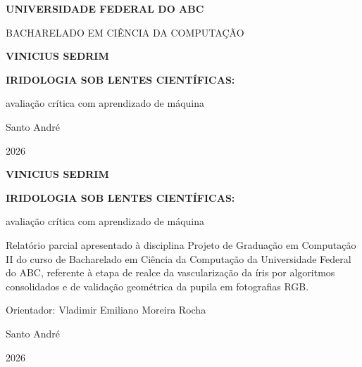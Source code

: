 \documentclass[12pt, oneside, a4paper, chapter=TITLE, section=TITLE,
               english, brazil]{abntex2}
\begin{document}
\frenchspacing

\begin{capa}
  \centering
  {\bfseries UNIVERSIDADE FEDERAL DO ABC\par}
  {BACHARELADO EM CIÊNCIA DA COMPUTAÇÃO\par}
  \vspace*{2.5cm}
  {\bfseries VINICIUS SEDRIM\par}
  \vfill
  {\bfseries IRIDOLOGIA SOB LENTES CIENTÍFICAS:\par}
  \vspace{4pt}
  {avaliação crítica com aprendizado de máquina\par}
  \vfill
  Santo André\par
  2026\par
\end{capa}

\begin{folhaderosto}
  \centering
  {\bfseries VINICIUS SEDRIM\par}
  \vfill
  {\bfseries IRIDOLOGIA SOB LENTES CIENTÍFICAS:\par}
  \vspace{4pt}
  {avaliação crítica com aprendizado de máquina\par}
  \vfill
  \hspace{.45\textwidth}%
  \begin{minipage}{.55\textwidth}
    \SingleSpacing
    Relatório parcial apresentado à disciplina Projeto de Graduação em
    Computação II do curso de Bacharelado em Ciência da Computação da
    Universidade Federal do ABC, referente à etapa de realce da
    vascularização da íris por algoritmos consolidados e de validação
    geométrica da pupila em fotografias RGB.

    \vspace{0.6cm}
    Orientador: Vladimir Emiliano Moreira Rocha
  \end{minipage}
  \vfill
  Santo André\par
  2026\par
\end{folhaderosto}
\end{document}
